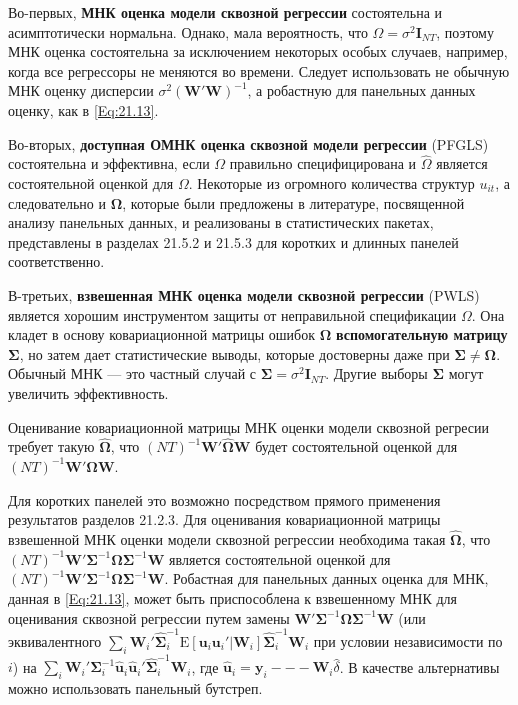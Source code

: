 Во-первых, \textbf{МНК оценка модели сквозной регрессии} состоятельна и асимптотически нормальна. Однако, мала вероятность, что $\Omega=\sigma^2 \mathbf I_{NT}$, поэтому МНК оценка состоятельна за исключением некоторых особых случаев, например, когда все регрессоры не меняются во времени.  Следует использовать не обычную МНК оценку дисперсии  $\sigma^2 (\mathbf W' \mathbf W)^{-1}$, а робастную для панельных данных оценку, как в \ref{Eq:21.13}. 

Во-вторых, \textbf{доступная ОМНК оценка сквозной модели регрессии} (PFGLS) состоятельна и эффективна, если $\Omega$ правильно специфицирована и $\hat{\Omega}$ является состоятельной оценкой для $\Omega$. Некоторые из огромного количества структур $u_{it}$, а следовательно и $\bm\Omega$, которые были предложены в литературе, посвященной анализу панельных данных, и реализованы в статистических пакетах, представлены в разделах 21.5.2 и 21.5.3 для коротких и длинных панелей соответственно.

В-третьих, \textbf{взвешенная МНК оценка модели сквозной регрессии} (PWLS) является хорошим инструментом защиты от неправильной спецификации $\Omega$. Она кладет в основу ковариационной матрицы ошибок $\bm\Omega$ \textbf{вспомогательную матрицу $\bm\Sigma$}, но затем дает статистические выводы, которые достоверны даже при $\bm\Sigma \neq \bm\Omega$. Обычный МНК --- это частный случай с $\bm\Sigma = \sigma^2 \mathbf I_{NT}$. Другие выборы $\bm\Sigma$ могут увеличить эффективность.

Оценивание ковариационной матрицы МНК оценки модели сквозной регресии требует такую $\hat{\bm\Omega}$, что $(NT)^{-1} \mathbf W' \hat{\bm\Omega} \mathbf W$ будет состоятельной оценкой для $(NT)^{-1} \mathbf W' \bm\Omega \mathbf W$.

Для коротких панелей это возможно посредством прямого применения результатов разделов 21.2.3. Для оценивания ковариационной матрицы взвешенной МНК оценки модели сквозной регрессии необходима такая $\hat{\bm\Omega}$, что $(NT)^{-1} \mathbf W' \bm\Sigma^{-1} \hat{\bm\Omega}\bm\Sigma^{-1} \mathbf W$ является состоятельной оценкой для $(NT)^{-1} \mathbf W' \bm\Sigma^{-1} \bm\Omega \bm\Sigma^{-1} \mathbf W$. Робастная для панельных данных оценка для МНК, данная в \ref{Eq:21.13}, может быть приспособлена к взвешенному МНК для оценивания сквозной регрессии путем замены $\mathbf W' \bm\Sigma^{-1} \bm\Omega \bm\Sigma^{-1} \mathbf W$ (или эквивалентного $\sum_i \mathbf W_i' \hat{\bm\Sigma}^{-1}_i \mathrm E[\mathbf u_i \mathbf u_i' | \mathbf W_i] \hat{\bm\Sigma}^{-1}_i \mathbf W_i$ при условии независимости по $i$) на  $\sum_i \mathbf W_i' \bm\Sigma^{-1}_i \hat{\mathbf u}_i \hat{\mathbf u}_i'  \hat{\bm\Sigma}^{-1}_i \mathbf W_i$, где $\hat{\mathbf u}_i=\mathbf y_i --- \mathbf W_i \hat{\delta}$. В качестве альтернативы можно использовать панельный бутстреп.

